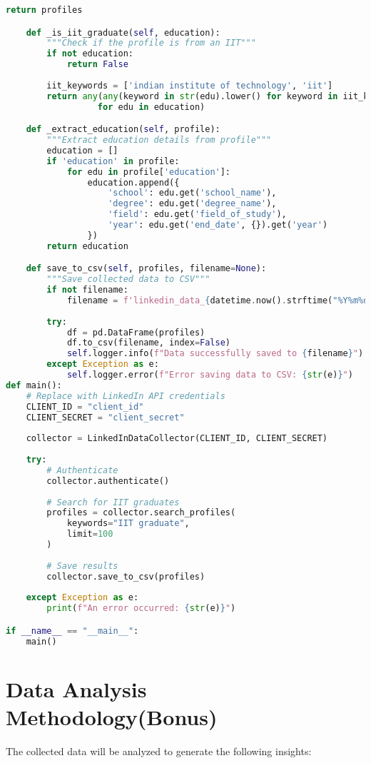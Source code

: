\documentclass{article}
\begin{document}
\begin{lstlisting}[language=Python]
        return profiles

    def _is_iit_graduate(self, education):
        """Check if the profile is from an IIT"""
        if not education:
            return False
            
        iit_keywords = ['indian institute of technology', 'iit']
        return any(any(keyword in str(edu).lower() for keyword in iit_keywords) 
                  for edu in education)

    def _extract_education(self, profile):
        """Extract education details from profile"""
        education = []
        if 'education' in profile:
            for edu in profile['education']:
                education.append({
                    'school': edu.get('school_name'),
                    'degree': edu.get('degree_name'),
                    'field': edu.get('field_of_study'),
                    'year': edu.get('end_date', {}).get('year')
                })
        return education

    def save_to_csv(self, profiles, filename=None):
        """Save collected data to CSV"""
        if not filename:
            filename = f'linkedin_data_{datetime.now().strftime("%Y%m%d_%H%M%S")}.csv'
            
        try:
            df = pd.DataFrame(profiles)
            df.to_csv(filename, index=False)
            self.logger.info(f"Data successfully saved to {filename}")
        except Exception as e:
            self.logger.error(f"Error saving data to CSV: {str(e)}")
def main():
    # Replace with LinkedIn API credentials
    CLIENT_ID = "client_id"
    CLIENT_SECRET = "client_secret"
    
    collector = LinkedInDataCollector(CLIENT_ID, CLIENT_SECRET)
    
    try:
        # Authenticate
        collector.authenticate()
        
        # Search for IIT graduates
        profiles = collector.search_profiles(
            keywords="IIT graduate",
            limit=100
        )
        
        # Save results
        collector.save_to_csv(profiles)
        
    except Exception as e:
        print(f"An error occurred: {str(e)}")

if __name__ == "__main__":
    main()
\end{lstlisting}

\section{Data Analysis Methodology(Bonus)}
The collected data will be analyzed to generate the following insights:
\end{document}

